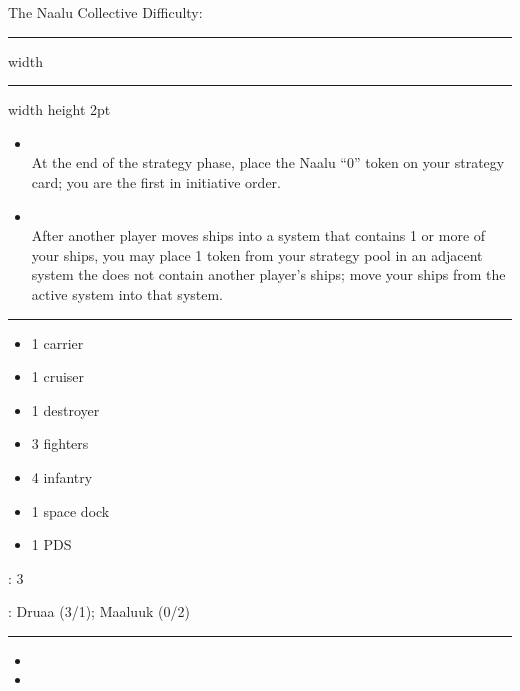 \newpage
{\handel\Huge The Naalu Collective} \hfill {\Large Difficulty: \medium} \vspace{-4pt}\\
\hrule width \hsize \kern 1mm \hrule width \hsize height 2pt


\begin{multicols}{2}


\begin{itemize}
\item {}\\
At the end of the strategy phase, place the Naalu ``0'' token on your strategy card; you are the first in initiative order.
\item {}\\
After another player moves ships into a system that contains 1 or more of your ships, you may place 1 token from your strategy pool in an adjacent system the does not contain another player's ships; move your ships from the active system into that system.
\end{itemize}


\vspace{-10pt}\rule{\hsize}{0.4pt}\vspace{5pt}


\vspace{-5pt}
\begin{multicols}{2}
\begin{itemize}
\item 1 carrier
\item 1 cruiser
\item 1 destroyer
\item 3 fighters
\item 4 infantry
\item 1 space dock
\item 1 PDS
\end{itemize}
\end{multicols}

\vspace{-5pt}
: 3

\vspace{2pt}
: Druaa (3/1); Maaluuk (0/2)

\rule{\hsize}{0.4pt}\vspace{5pt}


\begin{itemize}
\item \neural
\item \sarween
\end{itemize}


\end{multicols}
